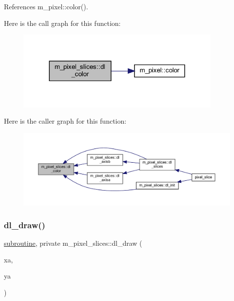 References m\+\_\+pixel\+::color().

Here is the call graph for this function\+:
\nopagebreak
\begin{figure}[H]
\begin{center}
\leavevmode
\includegraphics[width=288pt]{namespacem__pixel__slices_a8e362bf8eea80faddc97f7d137c95f9c_cgraph}
\end{center}
\end{figure}
Here is the caller graph for this function\+:
\nopagebreak
\begin{figure}[H]
\begin{center}
\leavevmode
\includegraphics[width=350pt]{namespacem__pixel__slices_a8e362bf8eea80faddc97f7d137c95f9c_icgraph}
\end{center}
\end{figure}
\mbox{\label{namespacem__pixel__slices_acafdf0174290a0e231ca120f6305b5d0}} 
\subsubsection{\texorpdfstring{dl\+\_\+draw()}{dl\_draw()}}
{\footnotesize\ttfamily \hyperlink{M__stopwatch_83_8txt_acfbcff50169d691ff02d4a123ed70482}{subroutine}, private m\+\_\+pixel\+\_\+slices\+::dl\+\_\+draw (\begin{DoxyParamCaption}\item[{}]{xa,  }\item[{}]{ya }\end{DoxyParamCaption})\hspace{0.3cm}{\ttfamily [private]}}



